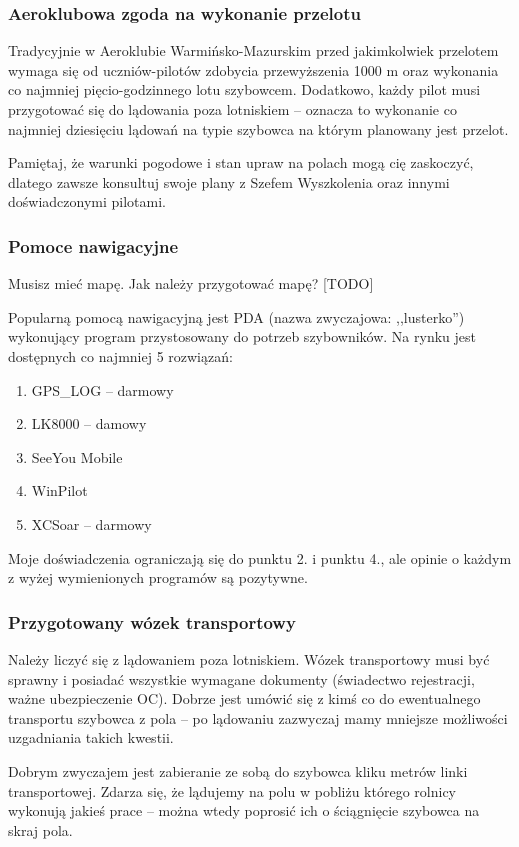 \documentclass{article}
\begin{document}
\subsubsection{Aeroklubowa zgoda na wykonanie przelotu}
Tradycyjnie w Aeroklubie Warmińsko-Mazurskim przed jakimkolwiek przelotem
wymaga się od uczniów-pilotów zdobycia przewyższenia 1000 m oraz wykonania
co najmniej pięcio-godzinnego lotu szybowcem. Dodatkowo, każdy pilot musi
przygotować się do lądowania poza lotniskiem -- oznacza to wykonanie co
najmniej dziesięciu lądowań na typie szybowca na którym planowany jest
przelot.

Pamiętaj, że warunki pogodowe i stan upraw na polach mogą cię zaskoczyć,
dlatego zawsze konsultuj swoje plany z Szefem Wyszkolenia oraz innymi
doświadczonymi pilotami.

\subsubsection{Pomoce nawigacyjne}
Musisz mieć mapę. Jak należy przygotować mapę?
[TODO] %

Popularną pomocą nawigacyjną jest PDA (nazwa zwyczajowa: ,,lusterko'') 
wykonujący program przystosowany
do potrzeb szybowników. Na rynku jest dostępnych co najmniej 5
rozwiązań:
\begin{enumerate}
\item GPS\_LOG -- darmowy
\item LK8000 -- damowy
\item SeeYou Mobile
\item WinPilot
\item XCSoar -- darmowy
\end{enumerate}
Moje doświadczenia ograniczają się do punktu 2. i punktu 4., ale
opinie o każdym z wyżej wymienionych programów są pozytywne.

\subsubsection{Przygotowany wózek transportowy}
Należy liczyć się z lądowaniem poza lotniskiem. 
Wózek transportowy musi być sprawny i posiadać wszystkie wymagane
dokumenty (świadectwo rejestracji, ważne ubezpieczenie OC). Dobrze jest
umówić się z kimś co do ewentualnego transportu szybowca z pola -- po
lądowaniu zazwyczaj mamy mniejsze możliwości uzgadniania takich kwestii.

Dobrym zwyczajem jest zabieranie ze sobą do szybowca kliku metrów
linki transportowej. Zdarza się, że lądujemy na polu w pobliżu którego
rolnicy wykonują jakieś prace -- można wtedy poprosić ich o ściągnięcie
szybowca na skraj pola.
\end{document}
